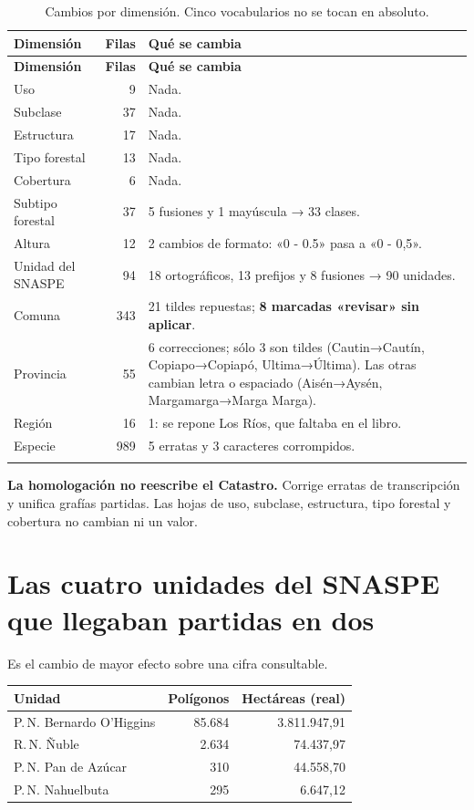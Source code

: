 \documentclass[11pt,a4paper]{report}
\newcommand{\campo}[1]{\textcolor{conaf}{\textbf{#1}}}
\begin{document}
\begin{longtable}{@{}L{3.6cm} r L{7.6cm}@{}}
\toprule
\textbf{Dimensión} & \textbf{Filas} & \textbf{Qué se cambia}\\
\midrule
\endfirsthead
\toprule
\textbf{Dimensión} & \textbf{Filas} & \textbf{Qué se cambia}\\
\midrule
\endhead
Uso & 9 & Nada.\\
Subclase & 37 & Nada.\\
Estructura & 17 & Nada.\\
Tipo forestal & 13 & Nada.\\
Cobertura & 6 & Nada.\\
Subtipo forestal & 37 & 5 fusiones y 1 mayúscula → 33 clases.\\
Altura & 12 & 2 cambios de formato: «0 - 0.5» pasa a «0 - 0,5».\\
Unidad del SNASPE & 94 & 18 ortográficos, 13 prefijos y 8 fusiones → 90 unidades.\\
Comuna & 343 & 21 tildes repuestas; \textbf{8 marcadas «revisar» sin aplicar}.\\
Provincia & 55 & 6 correcciones; sólo 3 son tildes (Cautin→Cautín, Copiapo→Copiapó, Ultima→Última). Las otras cambian letra o espaciado (Aisén→Aysén, Margamarga→Marga Marga).\\
Región & 16 & 1: se repone Los Ríos, que faltaba en el libro.\\
Especie & 989 & 5 erratas y 3 caracteres corrompidos.\\
\bottomrule
\caption{Cambios por dimensión. Cinco vocabularios no se tocan en absoluto.}
\end{longtable}

\begin{nota}
\campo{La homologación no reescribe el Catastro.} Corrige erratas de
transcripción y unifica grafías partidas. Las hojas de uso, subclase,
estructura, tipo forestal y cobertura no cambian ni un valor.
\end{nota}

\section{Las cuatro unidades del SNASPE que llegaban partidas en dos}

Es el cambio de mayor efecto sobre una cifra consultable.

\begin{center}
\begin{tabular}{@{}L{4.9cm} r r@{}}
\toprule
\textbf{Unidad} & \textbf{Polígonos} & \textbf{Hectáreas (real)}\\
\midrule
P.\,N. Bernardo O'Higgins & 85.684 & 3.811.947,91\\
R.\,N. Ñuble & 2.634 & 74.437,97\\
P.\,N. Pan de Azúcar & 310 & 44.558,70\\
P.\,N. Nahuelbuta & 295 & 6.647,12\\
\bottomrule
\end{tabular}
\end{center}
\end{document}
